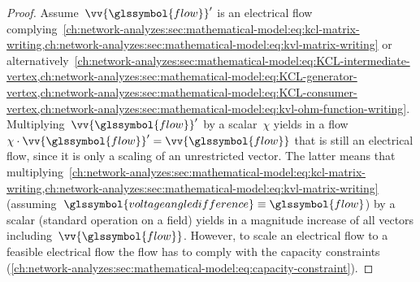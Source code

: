 % 
\begin{proof}
    Assume~$\vv{\glssymbol{flow}}'$ is an electrical flow
    complying~\cref{ch:network-analyzes:sec:mathematical-model:eq:kcl-matrix-writing,ch:network-analyzes:sec:mathematical-model:eq:kvl-matrix-writing}
    or
    alternatively~\cref{ch:network-analyzes:sec:mathematical-model:eq:KCL-intermediate-vertex,ch:network-analyzes:sec:mathematical-model:eq:KCL-generator-vertex,ch:network-analyzes:sec:mathematical-model:eq:KCL-consumer-vertex,ch:network-analyzes:sec:mathematical-model:eq:kvl-ohm-function-writing}.
    Multiplying~$\vv{\glssymbol{flow}}'$ by a scalar~$\chi$ yields in a
    flow~$\chi\cdot\vv{\glssymbol{flow}}' = \vv{\glssymbol{flow}}$ that is still
    an electrical flow, since it is only a scaling of an unrestricted vector.
    The latter means that
    multiplying~\cref{ch:network-analyzes:sec:mathematical-model:eq:kcl-matrix-writing,ch:network-analyzes:sec:mathematical-model:eq:kvl-matrix-writing}
    (assuming~$
    \glssymbol{voltageangledifference}\equiv\glssymbol{flow}$) by a scalar 
    (standard operation on a field) yields in a magnitude increase of all
    vectors including~$\vv{\glssymbol{flow}}$. However, to scale an electrical
    flow to a feasible electrical flow the flow has to comply with the capacity
    constraints 
    (\cref{ch:network-analyzes:sec:mathematical-model:eq:capacity-constraint}).
    

\end{proof}
